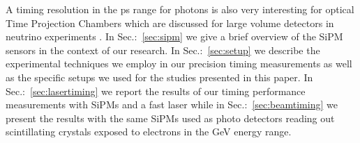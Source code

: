 A timing resolution in the ps range for photons is also very interesting for optical Time Projection Chambers 
which are discussed for large volume detectors in neutrino experiments \cite{lappd, otpc}. 
%
%
%
In Sec.:~\ref{sec:sipm} we give a brief overview of the SiPM sensors in the context of our research. In Sec.:~\ref{sec:setup} 
we describe the experimental techniques we employ in our precision timing measurements as well as the specific setups we 
used for the studies presented in this paper. In Sec.:~\ref{sec:lasertiming} we report the results of our timing 
performance measurements with SiPMs and a fast laser while in Sec.:~\ref{sec:beamtiming} we present the results 
with the same SiPMs used as photo detectors reading out scintillating crystals exposed to electrons in the GeV energy range.

